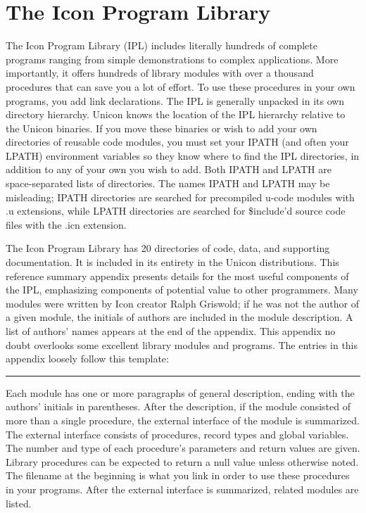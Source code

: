 \chapter{The Icon Program Library}

The Icon Program Library (IPL) includes
literally hundreds of complete programs ranging from simple
demonstrations to complex applications. More importantly, it offers
hundreds of library modules with over a thousand procedures that can
save you a lot of effort. To use these procedures in your own programs,
you add link declarations. The IPL is generally unpacked in
its own directory hierarchy. Unicon knows the location of the IPL
hierarchy relative to the Unicon binaries. If you move these binaries
or wish to add your own directories of reusable code modules, you must
set your IPATH (and often your LPATH)
environment variables so they know
where to find the IPL directories, in addition to any of your own you
wish to add. Both IPATH and LPATH are space-separated lists of
directories. The names IPATH and LPATH may be misleading; IPATH
directories are searched for precompiled u-code modules with .u
extensions, while LPATH directories are searched for
\$include'd source code files with
the .icn extension.

The Icon Program Library has 20
directories of code, data, and supporting documentation. It
is included in its entirety in the Unicon distributions.
This reference summary appendix presents details for
the most useful components of the IPL, emphasizing components
of potential value to other programmers.
Many modules were written by Icon creator Ralph Griswold; if he was not
the author of a given module,
the initials of authors are included in the module description. A list of
authors' names appears at the end of the appendix. This
appendix no doubt overlooks some excellent library modules and programs.
The entries in this appendix loosely follow this template:

\vspace{0.25cm}\hrule{}

Each module has one or more paragraphs of general description, ending
with the authors' initials in parentheses. After the
description, if the module consisted of more than a single procedure,
the external interface of the module is summarized. The external
interface consists of procedures, record types and global variables.
The number and type of each procedure's parameters and
return values are given. Library procedures can be expected to return a
null value unless otherwise noted. The filename at the beginning is
what you link in order to use these procedures in your
programs. After the external interface is summarized, related modules
are listed.

